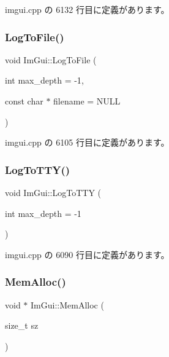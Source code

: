  imgui.\+cpp の 6132 行目に定義があります。

\mbox{\label{namespace_im_gui_ab62461a65c153b9f40842debef8aa755}} 
\subsubsection{\texorpdfstring{Log\+To\+File()}{LogToFile()}}
{\footnotesize\ttfamily void Im\+Gui\+::\+Log\+To\+File (\begin{DoxyParamCaption}\item[{int}]{max\+\_\+depth = {\ttfamily -\/1},  }\item[{const char $\ast$}]{filename = {\ttfamily NULL} }\end{DoxyParamCaption})}



 imgui.\+cpp の 6105 行目に定義があります。

\mbox{\label{namespace_im_gui_a37696f5296f33ae4218f53b40b81cccc}} 
\subsubsection{\texorpdfstring{Log\+To\+T\+T\+Y()}{LogToTTY()}}
{\footnotesize\ttfamily void Im\+Gui\+::\+Log\+To\+T\+TY (\begin{DoxyParamCaption}\item[{int}]{max\+\_\+depth = {\ttfamily -\/1} }\end{DoxyParamCaption})}



 imgui.\+cpp の 6090 行目に定義があります。

\mbox{\label{namespace_im_gui_a15efb2cac4a54b35489c5984ba1b661a}} 
\subsubsection{\texorpdfstring{Mem\+Alloc()}{MemAlloc()}}
{\footnotesize\ttfamily void $\ast$ Im\+Gui\+::\+Mem\+Alloc (\begin{DoxyParamCaption}\item[{size\+\_\+t}]{sz }\end{DoxyParamCaption})}



